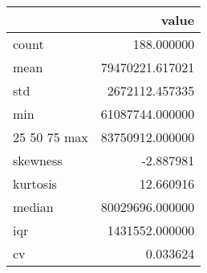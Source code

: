 \begin{tabular}{lr}
\toprule
 & value \\
\midrule
count & 188.000000 \\
mean & 79470221.617021 \\
std & 2672112.457335 \\
min & 61087744.000000 \\
25%
50%
75%
max & 83750912.000000 \\
skewness & -2.887981 \\
kurtosis & 12.660916 \\
median & 80029696.000000 \\
iqr & 1431552.000000 \\
cv & 0.033624 \\
\bottomrule
\end{tabular}

